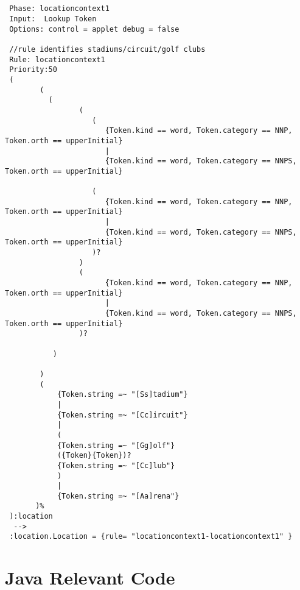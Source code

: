 \documentclass[a4paper,12pt]{report}
\begin{document}
\begin{verbatim}
 
 
 Phase: locationcontext1
 Input:  Lookup Token 
 Options: control = applet debug = false
 
 //rule identifies stadiums/circuit/golf clubs
 Rule: locationcontext1
 Priority:50
 (
     	(
 	      (
 	  		 	 (
 	  		 	 	(
 	  		 	 	   {Token.kind == word, Token.category == NNP, Token.orth == upperInitial}
 	  		 	 	   |
 	  		 	 	   {Token.kind == word, Token.category == NNPS, Token.orth == upperInitial}
 	  		 	 	
 	  		 	 	(
 	  		 	 	   {Token.kind == word, Token.category == NNP, Token.orth == upperInitial}
 	  		 	 	   |
 	  		 	 	   {Token.kind == word, Token.category == NNPS, Token.orth == upperInitial}
 	  		 	 	)?
 	  		 	 )
 	  		 	 (
 	  		 	 	   {Token.kind == word, Token.category == NNP, Token.orth == upperInitial}
 	  		 	 	   |
 	  		 	 	   {Token.kind == word, Token.category == NNPS, Token.orth == upperInitial}
 	  		 	 )?
 	  		 	 
 	  	   )
   		  
 		)
 		(
 			{Token.string =~ "[Ss]tadium"}
 			|
 			{Token.string =~ "[Cc]ircuit"}
 			|
 			(
 			{Token.string =~ "[Gg]olf"}
 			({Token}{Token})?
 			{Token.string =~ "[Cc]lub"}
 			)
 			|
 			{Token.string =~ "[Aa]rena"}
 	   )%
 ):location
  -->  
 :location.Location = {rule= "locationcontext1-locationcontext1" }

\end{verbatim}


\section{Java Relevant Code}
\end{document}

